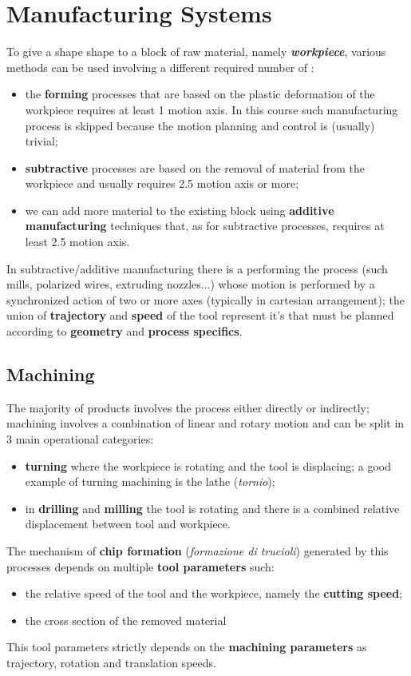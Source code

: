 \chapter{Manufacturing Systems}
	
	To give a shape shape to a block of raw material, namely \textit{\textbf{workpiece}}, various methods can be used involving a different required number of :
	\begin{itemize}
		\item the \textbf{forming} processes that are based on the plastic deformation of the workpiece requires at least 1 motion axis. In this course such manufacturing process is skipped because the motion planning and control is (usually) trivial;
		\item \textbf{subtractive} processes are based on the removal of material from the workpiece and usually requires 2.5 motion axis or more;
		\item we can add more material to the existing block using \textbf{additive manufacturing} techniques that, as for subtractive processes, requires at least 2.5 motion axis.
	\end{itemize}
	In subtractive/additive manufacturing there is a  performing the process (such mills, polarized wires, extruding nozzles...) whose motion is performed by a synchronized action of two or more axes (typically in cartesian arrangement); the union of \textbf{trajectory} and \textbf{speed} of the tool represent it's  that must be planned according to \textbf{geometry} and \textbf{process specifics}.
	
	
\section{Machining}
	
	The majority of products involves the  process either directly or indirectly; machining involves a combination of linear and rotary motion and can be split in 3 main operational categories:
	\begin{itemize}
		\item \textbf{turning} where the workpiece is rotating and the tool is displacing; a good example of turning machining is the lathe (\textit{tornio});
		\item in \textbf{drilling} and \textbf{milling} the tool is rotating and there is a combined relative displacement between tool and workpiece.
	\end{itemize}
	The mechanism of \textbf{chip formation} (\textit{formazione di trucioli}) generated by this processes depends on multiple \textbf{tool parameters} such:
	\begin{itemize}
		\item the relative speed of the tool and the workpiece, namely the \textbf{cutting speed};
		\item the cross section of the removed material
	\end{itemize}
	This tool parameters strictly depends on the \textbf{machining parameters} as trajectory, rotation and translation speeds.
	
